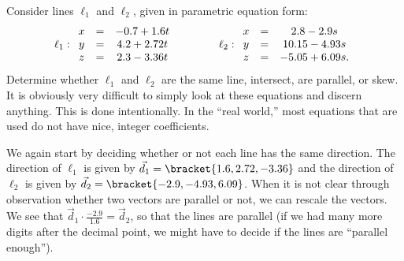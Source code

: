 \begin{example}\label{ex_lines3}
Consider lines $\ell_1$ and $\ell_2$, given in parametric equation form:
\[
\ell_1: \begin{array}{ c c c } x&=&-0.7+1.6t \\ y&=&4.2+2.72t\\z&=&2.3-3.36t\end{array}
\qquad\qquad
\ell_2:\begin{array}{ c c c } x&=&2.8-2.9s\\y&=&10.15-4.93s\\z&=&-5.05+6.09s.\end{array}
\]
Determine whether $\ell_1$ and $\ell_2$ are the same line, intersect, are parallel, or skew.
\solution
It is obviously very difficult to simply look at these equations and discern anything. This is done intentionally. In the ``real world,'' most equations that are used do not have nice, integer coefficients.%

We again start by deciding whether or not each line has the same direction. The direction of $\ell_1$ is given by $\vec d_1 =\bracket{1.6,2.72,-3.36}$ and the direction of $\ell_2$ is given by $\vec d_2 =\bracket{-2.9,-4.93,6.09}$. When it is not clear through observation whether two vectors are parallel or not,
%
we can rescale the vectors.  We see that $\vec d_1\cdot\frac{-2.9}{1.6}=\vec d_2$, so that the lines are parallel (if we had many more digits after the decimal point, we might have to decide if the lines are ``parallel enough'').


\end{example}
